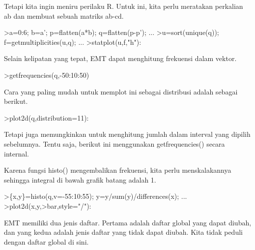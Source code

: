 \documentclass[a4paper,10pt]{article}
\begin{document}
\begin{eulernotebook}
\begin{eulercomment}
\begin{eulercomment}
\begin{eulercomment}
\begin{eulercomment}
\begin{eulercomment}
\begin{eulercomment}
\begin{eulercomment}
\begin{eulercomment}
\begin{eulercomment}
\begin{eulercomment}
\begin{eulercomment}
\begin{eulercomment}
\begin{eulercomment}
\begin{eulercomment}
\begin{eulercomment}
\begin{eulercomment}
\begin{eulercomment}
\begin{eulercomment}
\begin{eulercomment}
\begin{eulercomment}
\begin{eulercomment}
\begin{eulercomment}
\begin{eulercomment}
Tetapi kita ingin meniru perilaku R. Untuk ini, kita perlu meratakan
perkalian ab dan membuat sebuah matriks ab-cd.
\end{eulercomment}
\begin{eulerprompt}
>a=0:6; b=a'; p=flatten(a*b); q=flatten(p-p'); ...
>u=sort(unique(q)); f=getmultiplicities(u,q); ...
>statplot(u,f,"h"):
\end{eulerprompt}
\begin{eulercomment}
Selain kelipatan yang tepat, EMT dapat menghitung frekuensi dalam
vektor.
\end{eulercomment}
\begin{eulerprompt}
>getfrequencies(q,-50:10:50)
\end{eulerprompt}
\begin{euleroutput}
  [0,  23,  132,  316,  602,  801,  333,  141,  53,  0]
\end{euleroutput}
\begin{eulercomment}
Cara yang paling mudah untuk memplot ini sebagai distribusi adalah
sebagai berikut.
\end{eulercomment}
\begin{eulerprompt}
>plot2d(q,distribution=11):
\end{eulerprompt}
\begin{eulercomment}
Tetapi juga memungkinkan untuk menghitung jumlah dalam interval yang
dipilih sebelumnya. Tentu saja, berikut ini menggunakan
getfrequencies() secara internal.

Karena fungsi histo() mengembalikan frekuensi, kita perlu
menskalakannya sehingga integral di bawah grafik batang adalah 1.
\end{eulercomment}
\begin{eulerprompt}
>\{x,y\}=histo(q,v=-55:10:55); y=y/sum(y)/differences(x); ...
>plot2d(x,y,>bar,style="/"):
\end{eulerprompt}
\begin{eulercomment}
EMT memiliki dua jenis daftar. Pertama adalah daftar global yang dapat
diubah, dan yang kedua adalah jenis daftar yang tidak dapat diubah.
Kita tidak peduli dengan daftar global di sini.


\end{eulercomment}
\end{eulercomment}
\end{eulercomment}
\end{eulercomment}
\end{eulercomment}
\end{eulercomment}
\end{eulercomment}
\end{eulercomment}
\end{eulercomment}
\end{eulercomment}
\end{eulercomment}
\end{eulercomment}
\end{eulercomment}
\end{eulercomment}
\end{eulercomment}
\end{eulercomment}
\end{eulercomment}
\end{eulercomment}
\end{eulercomment}
\end{eulercomment}
\end{eulercomment}
\end{eulercomment}
\end{eulercomment}
\end{eulernotebook}
\end{document}
